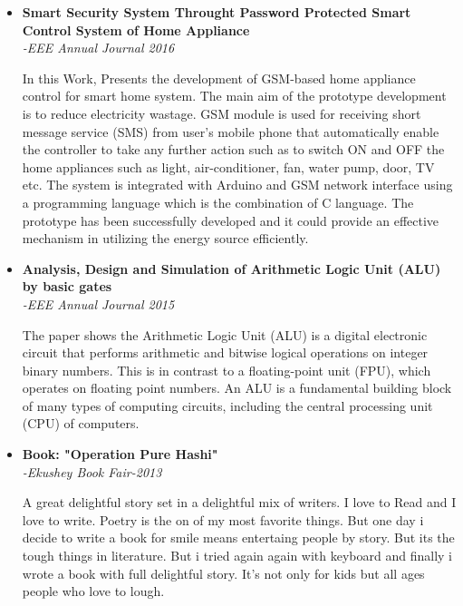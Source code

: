 \documentclass[11pt,a4paper,sans]{moderncv}        %
\begin{document}
\begin{itemize}

\item{\textbf{Smart Security System Throught Password Protected Smart Control System of Home Appliance} \textit{\\-EEE Annual Journal 2016}

\vspace{3pt}

\small{In this Work, Presents the development of GSM-based home appliance control for smart home system. The main aim of the prototype development is to reduce electricity wastage.
GSM module is used for receiving  short message  service (SMS) from user’s mobile phone  that automatically enable the controller to take any further action such as to switch ON and OFF the home appliances such as light, air-conditioner, fan, water pump, door, TV etc. The system is integrated with Arduino and GSM network interface using a programming language which is the combination of C language.
The prototype has been successfully developed and it could provide an effective mechanism in utilizing the energy source efficiently.}}

\vspace{6pt}

\item{\textbf{Analysis, Design and Simulation of Arithmetic Logic Unit (ALU) by basic gates} \textit{\\-EEE Annual Journal 2015}

\vspace{3pt}

\small{The paper shows the Arithmetic Logic Unit (ALU) is a digital electronic circuit that performs arithmetic and bitwise logical operations on integer binary numbers. This is in contrast to a floating-point unit (FPU), which operates on floating point numbers. An ALU is a fundamental building block of many types of computing circuits, including the central processing unit (CPU) of computers.}}

\vspace{6pt}

\item{\textbf{Book: "Operation Pure Hashi"} \textit{\\-Ekushey Book Fair-2013}

\vspace{3pt}

\small{A great delightful story set in a delightful mix of writers. I love to Read and I love to write. Poetry is the on of my most favorite things. But one day i decide to write a book for smile means entertaing people by story. But its the tough things in literature. But i tried again again with keyboard and finally i wrote a book with full delightful story. It's not only for kids but all ages people who love to lough.}}

\end{itemize}
\end{document}
